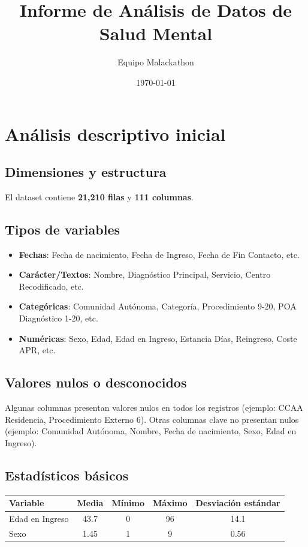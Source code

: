 \documentclass[a4paper,12pt]{article}
\title{Informe de Análisis de Datos de Salud Mental}
\author{Equipo Malackathon}
\date{\today}
\begin{document}
\maketitle

\section{Análisis descriptivo inicial}
\subsection{Dimensiones y estructura}
El dataset contiene \textbf{21,210 filas} y \textbf{111 columnas}.

\subsection{Tipos de variables}
\begin{itemize}
  \item \textbf{Fechas}: Fecha de nacimiento, Fecha de Ingreso, Fecha de Fin Contacto, etc.
  \item \textbf{Carácter/Textos}: Nombre, Diagnóstico Principal, Servicio, Centro Recodificado, etc.
  \item \textbf{Categóricas}: Comunidad Autónoma, Categoría, Procedimiento 9-20, POA Diagnóstico 1-20, etc.
  \item \textbf{Numéricas}: Sexo, Edad, Edad en Ingreso, Estancia Días, Reingreso, Coste APR, etc.
\end{itemize}

\subsection{Valores nulos o desconocidos}
Algunas columnas presentan valores nulos en todos los registros (ejemplo: CCAA Residencia, Procedimiento Externo 6). Otras columnas clave no presentan nulos (ejemplo: Comunidad Autónoma, Nombre, Fecha de nacimiento, Sexo, Edad en Ingreso).

\subsection{Estadísticos básicos}
\begin{tabular}{lcccc}
\toprule
Variable & Media & Mínimo & Máximo & Desviación estándar \\
\midrule
Edad en Ingreso & 43.7 & 0 & 96 & 14.1 \\
Sexo & 1.45 & 1 & 9 & 0.56 \\
\bottomrule
\end{tabular}
\end{document}

